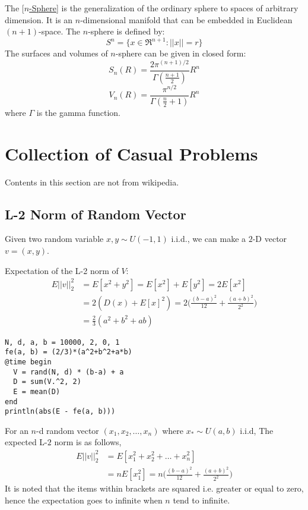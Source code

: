 The [\href{https://en.wikipedia.org/wiki/N-sphere}{$n$-Sphere}] is the
generalization of the ordinary sphere to spaces of arbitrary dimension.
It is an $n$-dimensional manifold that can be embedded in Euclidean
$(n+1)$-space. The $n$-sphere is defined by:
$$ S^n = \big\{x\in\Re^{n+1} : ||x|| = r \big\} $$
The surfaces and volumes of $n$-sphere can be given in closed form:
$$ S_n(R) = \frac{2\pi^{(n+1)/2}}{\Gamma(\frac{n+1}{2})} R^n $$
$$ V_n(R) = \frac{\pi^{n/2}}{\Gamma(\frac{n}{2} + 1)} R^n $$
where $\Gamma$ is the gamma function.


\section{Collection of Casual Problems}

Contents in this section are not from wikipedia.

\subsection{L-2 Norm of Random Vector}

Given two random variable $x, y \sim U(-1, 1)$ i.i.d., we can make
a $2$-D vector $v= (x, y)$.

Expectation of the L-2 norm of $V$:
\begin{align}
E||v||_2^2 &= E[x^2+y^2] = E[x^2] + E[y^2] = 2E[x^2]\\
  &= 2(D(x) + E[x]^2) = 2\big( \frac{(b-a)^2}{12} + \frac{(a+b)^2}{2^2} \big)\\
  &= \frac{2}{3}(a^2 + b^2 + ab)
\end{align}
\begin{verbatim}
N, d, a, b = 10000, 2, 0, 1
fe(a, b) = (2/3)*(a^2+b^2+a*b)
@time begin
  V = rand(N, d) * (b-a) + a
  D = sum(V.^2, 2)
  E = mean(D)
end
println(abs(E - fe(a, b)))
\end{verbatim}

For an $n$-d random vector $(x_1, x_2, \ldots, x_n)$ where $x_* \sim U(a,b)$
i.i.d, The expected L-$2$ norm is as follows,
\begin{align}
	E||v||_2^2 &= E[x_1^2 + x_2^2 + \ldots + x_n^2]\\
	&= n E[x_1^2] = n\big( \frac{(b-a)^2}{12} + \frac{(a+b)^2}{2^2} \big)
\end{align}
It is noted that the items within brackets are squared i.e. greater or equal
to zero, hence the expectation goes to infinite when $n$ tend to infinite.

